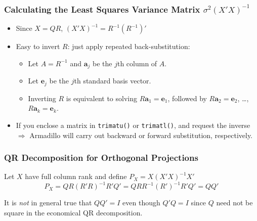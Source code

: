 \begin{frame}
  \frametitle{Calculating the Least Squares Variance Matrix $\sigma^2 (X'X)^{-1}$}
  \begin{itemize}
    \item Since $X = QR$, $(X'X)^{-1} = R^{-1} (R^{-1})'$
    \item Easy to invert $R$: just apply \alert{repeated} back-substitution:
      \begin{itemize}
        \item Let $A = R^{-1}$ and $\mathbf{a}_j$ be the $j$th column of $A$.
        \item Let $\mathbf{e}_j$ be the $j$th standard basis vector.
        \item Inverting $R$ is equivalent to solving $R \mathbf{a}_1 = \mathbf{e}_1$, followed by $R \mathbf{a}_2 = \mathbf{e}_2$, \dots, $R \mathbf{a}_k = \mathbf{e}_k$.
      \end{itemize}
    \item If you enclose a matrix in \texttt{trimatu()} or \texttt{trimatl()}, and request the inverse $\Rightarrow$ Armadillo will carry out backward or forward substitution, respectively.
  \end{itemize}

\end{frame}
\begin{frame}
  \frametitle{QR Decomposition for Orthogonal Projections}

Let $X$ have full column rank and define $P_X = X (X'X)^{-1}X'$
  $$P_X  = QR(R'R)^{-1}R'Q' = QRR^{-1} (R')^{-1}R'Q' = QQ'$$

  It is \emph{not} in general true that $QQ' = I$ even though $Q'Q = I$ since $Q$ need not be square in the economical QR decomposition. 

\end{frame}
